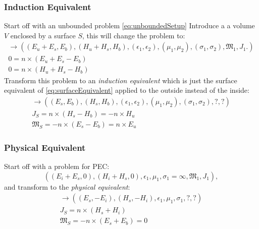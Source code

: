 \documentclass{article}
\numberwithin{equation}{section}
\begin{document}
            \subsubsection*{Induction Equivalent}
            Start off with an unbounded problem \eqref{eq:unboundedSetup}
            Introduce a a volume $V$ enclosed by a surface $S$, this will change the
            problem to:
            \begin{subequations} \label{eq:inductionSetup}
                \begin{align}
                    \to \left( (E_u + E_s, E_b), (H_u + H_s, H_b), (\epsilon_1,
                        \epsilon_2), (\mu_1, \mu_2), (\sigma_1, \sigma_2), \mathfrak{M}_1,
                        J_1. \right) \\
                    0 = n \times ( E_u + E_s - E_b ) \\
                    0 = n \times ( H_u + H_s - H_b )
                \end{align}
            \end{subequations}
            Transform this problem to an \emph{induction equivalent} which is just the
            surface equivalent of \eqref{eq:surfaceEquivalent} applied to the outside
            instead of the inside:
            \begin{subequations} \label{eq:inductionEquivalent}
                \begin{align}
                    \to \left( (E_s, E_b), (H_s, H_b), (\epsilon_1, \epsilon_2), (\mu_1,
                        \mu_2), (\sigma_1, \sigma_2), ?, ? \right) \\
                    J_S = n \times ( H_s - H_b ) = -n \times H_u \\
                    \mathfrak{M}_S = -n \times ( E_s - E_b ) = n \times E_u
                \end{align}
            \end{subequations}

            \subsubsection*{Physical Equivalent}
            Start off with a problem for PEC:
            \begin{equation} \label{eq:pecSetup}
                \left( (E_i + E_s, 0), (H_i + H_s, 0), \epsilon_1, \mu_1,
                \sigma_1=\infty, \mathfrak{M}_1, J_1 \right),
            \end{equation}
            and transform to the \emph{physical equivalent}:
            \begin{subequations} \label{eq:physicalEquivalent}
            \begin{align}
                \to \left( (E_s, -E_i), (H_s, -H_i), \epsilon_1, \mu_1, \sigma_1, ?, ?
                    \right) \\
                J_S = n \times ( H_s + H_i ) \\
                \mathfrak{M}_S = -n \times ( E_s + E_b ) = 0
            \end{align}
            \end{subequations}
            \newpage
\end{document}
